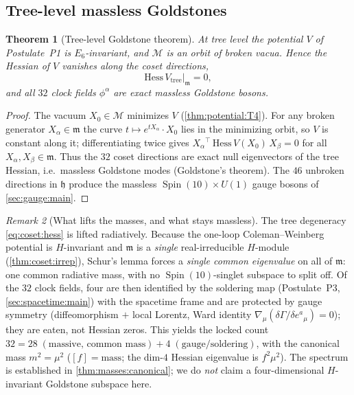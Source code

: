 \documentclass[11pt]{article}
\theoremstyle{plain}
\newtheorem{theorem}{Theorem}[section]
\theoremstyle{definition}
\theoremstyle{remark}
\newtheorem{remark}[theorem]{Remark}
\newcommand{\Spin}{\operatorname{Spin}}
\begin{document}
\subsection{Tree-level massless Goldstones}
\label{sec:coset:goldstone}

\begin{theorem}[Tree-level Goldstone theorem]\label{thm:coset:goldstone}
At tree level the potential $V$ of Postulate~P1 is $E_{6}$-invariant, and
$\mathcal M$ is an orbit of broken vacua. Hence the Hessian of $V$ vanishes
along the coset directions,
\begin{equation}\label{eq:coset:hess}
  \mathrm{Hess}\,V_{\mathrm{tree}}\big|_{\mathfrak m} = 0,
\end{equation}
and all $32$ clock fields $\phi^{\alpha}$ are exact massless Goldstone bosons.
\end{theorem}

\begin{proof}
The vacuum $X_{0}\in\mathcal M$ minimizes $V$ (\autoref{thm:potential:T4}). For any
broken generator $X_{\alpha}\in\mathfrak m$ the curve
$t\mapsto e^{tX_{\alpha}}\!\cdot X_{0}$ lies in the minimizing orbit, so $V$ is
constant along it; differentiating twice gives
$X_{\alpha}{}^{\!\top}\,\mathrm{Hess}\,V(X_{0})\,X_{\beta}=0$ for all
$X_{\alpha},X_{\beta}\in\mathfrak m$. Thus the $32$ coset directions are exact
null eigenvectors of the tree Hessian, i.e.\ massless Goldstone modes
(Goldstone's theorem). The $46$ unbroken directions in $\mathfrak h$ produce the
massless $\Spin(10)\times U(1)$ gauge bosons of \autoref{sec:gauge:main}.
\end{proof}

\begin{remark}[What lifts the masses, and what stays massless]\label{rem:coset:loop}
The tree degeneracy \eqref{eq:coset:hess} is lifted radiatively. Because the
one-loop Coleman--Weinberg potential is $H$-invariant and $\mathfrak m$ is a
\emph{single} real-irreducible $H$-module (\autoref{thm:coset:irrep}), Schur's
lemma forces a \emph{single common eigenvalue} on all of $\mathfrak m$: one
common radiative mass, with no $\Spin(10)$-singlet subspace to split off. Of the
$32$ clock fields, four are then identified by the soldering map (Postulate~P3,
\autoref{sec:spacetime:main}) with the spacetime frame and are protected by gauge
symmetry (diffeomorphism $+$ local Lorentz, Ward identity
$\nabla_{\mu}(\delta\Gamma/\delta e^{a}{}_{\mu})=0$); they are eaten, not Hessian
zeros. This yields the locked count $32 = 28\;(\text{massive, common mass})
+ 4\;(\text{gauge/soldering})$, with the canonical mass $m^{2}=\mu^{2}$
($[f]=\text{mass}$; the dim-$4$ Hessian eigenvalue is $f^{2}\mu^{2}$). The
spectrum is established in \autoref{thm:masses:canonical}; we do \emph{not} claim a
four-dimensional $H$-invariant Goldstone subspace here.
\end{remark}
\end{document}
